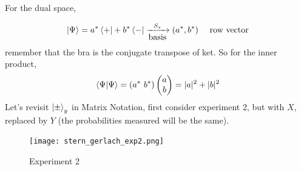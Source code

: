 \documentclass[english, 11pt]{article}
\begin{document}
          For the dual space,

          \[ \left|\Psi\right\rangle = a^*\left\langle+\right| + b^*\left\langle-\right| \xrightarrow[\mbox{basis}]{S_z} (a^*, b^*) \ \ \ \ \mbox{row vector} \]
          remember that the bra is the conjugate transpose of ket. So for the inner product,
          \[ \braket{\Psi}{\Psi} = (a^* \  b^*)\mtx{a \\ b} = |a|^2 + |b|^2 \]
          Let's revisit $\left|\pm\right\rangle_y$ in Matrix Notation, first consider experiment 2, but with $X$, replaced by $Y$ (the probabilities measured will be the same).

          \begin{figure}[t!]
            \centering
            \texttt{[image: stern\_gerlach\_exp2.png]}
            \caption{Experiment 2}
          \end{figure}
\end{document}
